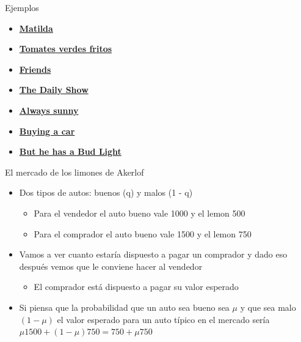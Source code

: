 \documentclass{beamer}
\begin{document}
\begin{frame}{Ejemplos}
    \begin{itemize}
    \item \href{https://www.youtube.com/watch?v=qlg0qakJhKU}{\textbf{Matilda}}
    \item \href{https://www.youtube.com/watch?v=akA8co61He4}{\textbf{Tomates verdes fritos}}
    \item \href{https://www.youtube.com/watch?v=X8BPfLhH6MA}{\textbf{Friends}}
    \item \href{https://videos.criticalcommons.org/media/encoded/16/jtierney86/43ba1b1ac3e94df3974f987cc912ae_Hxgbfl1.mp4}{\textbf{The Daily Show}}
    \item \href{http://videos.criticalcommons.org/transcoded/http/www.criticalcommons.org/Members/JJWooten/clips/always-sunny-paying-for-care/video_file/mp4-high/always-sunny-cost-of-care-mp4.mp4}{\textbf{Always sunny}}
    \item \href{https://www.youtube.com/watch?v=SrPu-xGrKrk}{\textbf{Buying a car}}
    \item \href{https://www.youtube.com/watch?v=ZZq0ShjEd-E}{\textbf{But he has a Bud Light}}
    \end{itemize}

\end{frame}
    
\begin{frame}{El mercado de los limones de Akerlof}
\begin{itemize}
    \item Dos tipos de autos: buenos (q) y malos (1 - q)
    \begin{itemize}
    \item Para el vendedor el auto bueno vale 1000 y el lemon 500 
    \item Para el comprador el auto bueno vale 1500 y el lemon 750 
    \end{itemize} \vspace{3mm}
    \item Vamos a ver cuanto estaría dispuesto a pagar un comprador y dado eso después vemos que le conviene hacer al vendedor
    \begin{itemize}
    \item El comprador está dispuesto a pagar su valor esperado
    \end{itemize} \vspace{3mm}
    \item Si piensa que la probabilidad que un auto sea bueno sea  $\mu$ y que sea malo  $(1-\mu)$ el valor esperado para un auto típico en el mercado sería  $\mu 1500 + (1-\mu) 750= 750 + \mu 750$ 
\end{itemize}
\end{frame}
\end{document}
